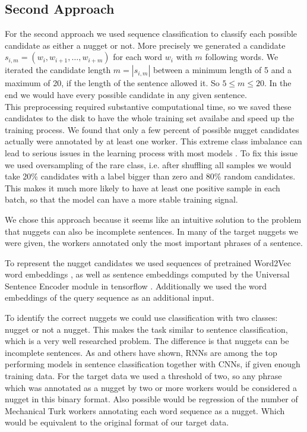 \documentclass{article}
\begin{document}
 \subsection{Second Approach}
For the second approach we used sequence classification to classify each possible candidate as either a nugget or not. More precisely we generated a candidate $s_{i,m}=(w_i, w_{i+1}, \dots , w_{i+m})$ for each word $w_i$ with $m$ following words. We iterated the candidate length $m=|s_{i,m}|$ between a minimum length of 5 and a maximum of 20, if the length of the sentence allowed it. So $5 \leq m \leq 20$. In the end we would have every possible candidate in any given sentence. \\
This preprocessing required substantive computational time, so we saved these candidates to the disk to have the whole training set availabe and speed up the training process. We found that only a few percent of possible nugget candidates actually were annotated by at least one worker. This extreme class imbalance can lead to serious issues in the learning process with most models \cite{japkowicz2002class}. To fix this issue we used oversampling of the rare class, i.e. after shuffling all samples we would take 20\% candidates with a label bigger than zero and 80\% random candidates. This makes it much more likely to have at least one positive sample in each batch, so that the model can have a more stable training signal.

We chose this approach because it seems like an intuitive solution to the problem that nuggets can also be incomplete sentences. In many of the target nuggets we were given, the workers annotated only the most important phrases of a sentence.

To represent the nugget candidates we used sequences of pretrained Word2Vec word embeddings \cite{w2v}, as well as sentence embeddings computed by the Universal Sentence Encoder module in tensorflow \cite{universal2018}. Additionally we used the word embeddings of the query sequence as an additional input.

To identify the correct nuggets we could use classification with two classes: nugget or not a nugget. This makes the task similar to sentence classification, which is a very well researched problem. The difference is that nuggets can be incomplete sentences. As \citep{zhou2015c} and others have shown, RNNs are among the top performing models in sentence classification together with CNNs, if given enough training data. For the target data we used a threshold of two, so any phrase which was annotated as a nugget by two or more workers would be considered a nugget in this binary format. Also possible would be regression of the number of Mechanical Turk workers annotating each word sequence as a nugget. Which would be equivalent to the original format of our target data.\\
\end{document}
